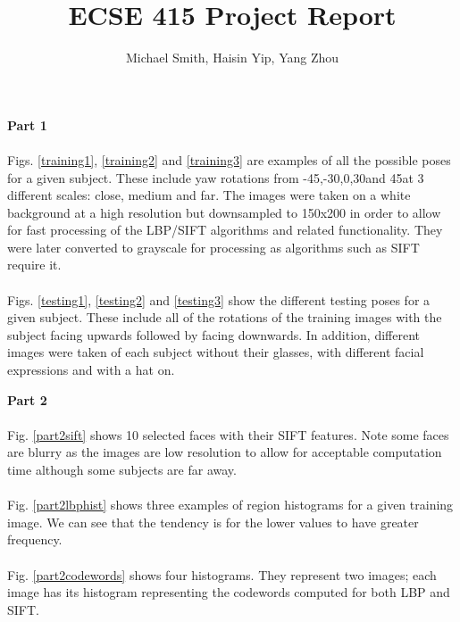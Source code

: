\documentclass[10pt,letterpaper]{article}
\author{Michael Smith, Haisin Yip, Yang Zhou}
\title{ECSE 415 Project Report}
\begin{document}
\maketitle

\textbf{Part 1}
\vspace{5mm}
\paragraph{}
Figs. \ref{training1}, \ref{training2} and \ref{training3} are examples of all the possible poses for a given subject.  These include yaw rotations from -45\degree,-30\degree,0\degree,30\degree and 45\degree at 3 different scales: close, medium and far.  The images were taken on a white background at a high resolution but downsampled to 150x200 in order to allow for fast processing of the LBP/SIFT algorithms and related functionality.  They were later converted to grayscale for processing as algorithms such as SIFT require it.
\paragraph{}
Figs. \ref{testing1}, \ref{testing2} and \ref{testing3} show the different testing poses for a given subject.  These include all of the rotations of the training images with the subject facing upwards followed by facing downwards.  In addition, different images were taken of each subject without their glasses, with different facial expressions and with a hat on.

\vspace{5mm}
\textbf{Part 2}
\paragraph{}
Fig. \ref{part2sift} shows 10 selected faces with their SIFT features. Note some faces are blurry as the images are low resolution to allow for acceptable computation time although some subjects are far away.
\paragraph{}
Fig. \ref{part2lbphist} shows three examples of region histograms for a given training image.  We can see that the tendency is for the lower values to have greater frequency.
\paragraph{}
Fig. \ref{part2codewords} shows four histograms.  They represent two images; each image has its histogram representing the codewords computed for both LBP and SIFT.
\end{document}
